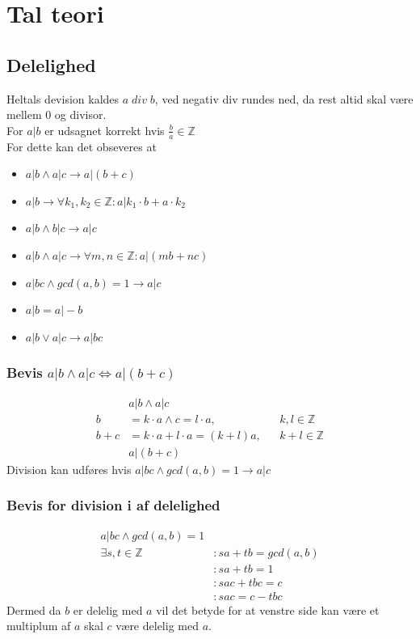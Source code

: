 \documentclass[12pt, a4paper]{article}
\begin{document}
		\section{Tal teori}
			\subsection{Delelighed}
				Heltals devision kaldes $a\; div\; b$, ved negativ div rundes ned, da rest altid  skal være mellem 0 og divisor.\\
				For $a|b$ er udsagnet korrekt hvis $\frac{b}{a}\in\mathbb{Z}$\\
				For dette kan det obseveres at 
				\begin{itemize}
					\item $a|b \land a|c \rightarrow a|(b+c)$
					\item $a|b\rightarrow \forall k_1,k_2\in \mathbb{Z} : a|k_1\cdot b+a\cdot k_2$
					\item $a|b\land b|c \rightarrow a|c$
					\item $a|b\land a|c \rightarrow \forall m,n \in \mathbb{Z}: a|(mb+nc)$
					\item $a|bc \land gcd(a,b) = 1 \rightarrow a|c$
					\item $a|b = a|-b$
					\item $a|b\lor a|c\rightarrow a|bc$
				\end{itemize}
				\subsubsection{Bevis $a|b\land a|c \iff a|(b+c)$}
					\begin{align*}
						&a|b\land a|c\\
						b&=k\cdot a \land c=l\cdot a,&&k,l\in\mathbb{Z}\\
						b+c&=k\cdot a + l\cdot a = (k+l)a, && k+l\in \mathbb{Z}\\
						&a|(b+c)
					\end{align*}
				Division kan udføres hvis $a|bc \land gcd(a,b)=1 \rightarrow a|c$\\
				\subsubsection{Bevis for division i af delelighed}
					\begin{align*}
						a|bc \land gcd(a,b)=1\\
						\exists s,t \in \mathbb{Z}&: sa+tb=gcd(a,b)\\
									  &: sa+tb=1\\
									  &: sac+tbc=c\\
									  &: sac=c-tbc
					\end{align*}
					Dermed da $b$ er delelig med $a$ vil det betyde for at venstre side kan være et multiplum af $a$ skal $c$ være delelig med $a$. 
				
\end{document}
